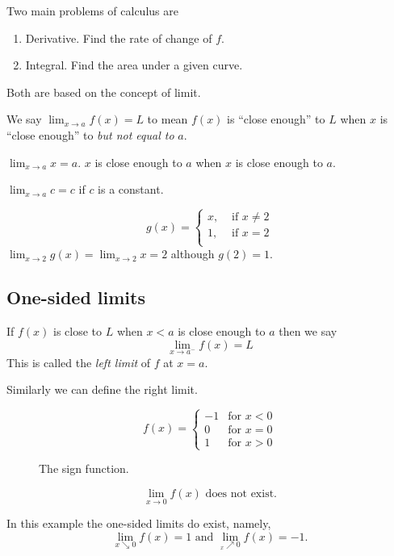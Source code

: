 \documentclass[../main.tex]{subfiles}
\begin{document}
Two main problems of calculus are
\begin{enumerate}
  \item Derivative. Find the rate of change of $f$.
  \item Integral. Find the area under a given curve.
\end{enumerate}
Both are based on the concept of limit.

We say $\lim_{x \to a} f(x) = L$ to mean $f(x)$ is ``close enough'' to $L$ when $x$ is ``close enough'' to \emph{but not equal to} $a$.

\begin{example}
  $\lim_{x \to a} x = a$. $x$ is close enough to $a$ when $x$ is close enough to $a$.
\end{example}

\begin{example}
  $\lim_{x \to a} c = c$ if $c$ is a constant.
\end{example}

\begin{example}
  \[
    g(x) =
    \begin{cases}
      x, &\text{ if } x\neq 2\\
      1, &\text{ if } x = 2\\
    \end{cases}
  \]
  $\lim_{x \to 2} g(x) = \lim_{x \to 2} x = 2$ although $g(2) = 1$.
\end{example}

\subsection*{One-sided limits}
If $f(x)$ is close to $L$ when $x<a$ is close enough to $a$ then we say
\[
  \lim_{x \to a^{-}} f(x) = L
\]
This is called the \emph{left limit} of $f$ at $x=a$.

Similarly we can define the right limit.

\begin{example}
  \[
  f(x) =
  \begin{cases}
    -1 & \text{for $x<0$}\\ 0 & \text{for $x=0$}\\ 1 & \text{for $x>0$}
  \end{cases}
  \]
  \begin{figure}[ht]
    
    \caption{The sign function.}
  \end{figure}

  \[
  \lim_{x\to 0} f(x) \text{ does not exist.}
  \]

  In this example the one-sided limits do exist, namely,
  \[
  \lim_{x\searrow0}f(x) = 1 \text{ and } \lim_{_x\nearrow0}f(x) = -1.
  \]
\end{example}
\end{document}
